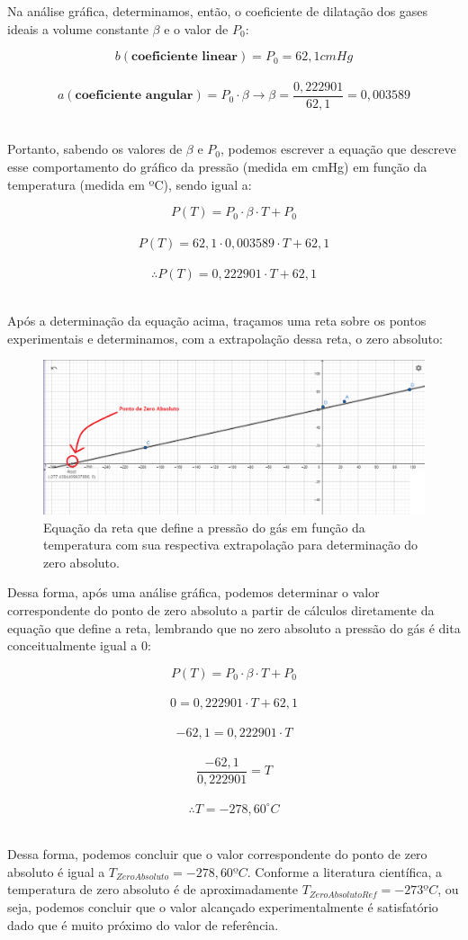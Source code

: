Na análise gráfica, determinamos, então, o coeficiente de dilatação dos gases ideais a volume constante $\beta$ e o valor de $P_0$:

\[ b (\textbf{coeficiente linear}) = P_0 = 62,1 cmHg\]\
\[ a (\textbf{coeficiente angular}) = P_0 \cdot \beta \longrightarrow \beta = \frac{0,222901}{62,1} = 0,003589\]\

Portanto, sabendo os valores de $\beta$ e $P_0$, podemos escrever a equação que descreve esse comportamento do gráfico da pressão (medida em cmHg) em função da temperatura (medida em ºC), sendo igual a:

\[ P(T) = P_0 \cdot \beta \cdot T + P_0 \]\
\[ P(T) = 62,1 \cdot 0,003589 \cdot T + 62,1 \]\
\[ \therefore P(T) = 0,222901 \cdot T + 62,1 \]\

Após a determinação da equação acima, traçamos uma reta sobre os pontos experimentais e determinamos, com a extrapolação dessa reta, o zero absoluto:

\begin{figure}[H]
  \centering
  \includegraphics[scale=0.45]{images/Gráfico 3 - experimento 3.png}
  \caption{Equação da reta que define a pressão do gás em função da temperatura com sua respectiva extrapolação para determinação do zero absoluto.}
\end{figure}

Dessa forma, após uma análise gráfica, podemos determinar o valor correspondente do ponto de zero absoluto a partir de cálculos diretamente da equação que define a reta, lembrando que no zero absoluto a pressão do gás é dita conceitualmente igual a 0: 

\[ P(T) = P_0 \cdot \beta \cdot T + P_0 \]\
\[ 0 = 0,222901 \cdot T + 62,1 \]\
\[ -62,1 = 0,222901 \cdot T  \]\
\[ \frac{-62,1}{0,222901}  =  T  \]\
\[ \therefore T = -278,60 ^\circ C \]\

Dessa forma, podemos concluir que o valor correspondente do ponto de zero absoluto é igual a $T_{Zero Absoluto}= -278,60 ºC$. Conforme a literatura científica, a temperatura de zero absoluto é de aproximadamente $T_{Zero Absoluto Ref}= -273 ºC$, ou seja, podemos concluir que o valor alcançado experimentalmente é satisfatório dado que é muito próximo do valor de referência. 